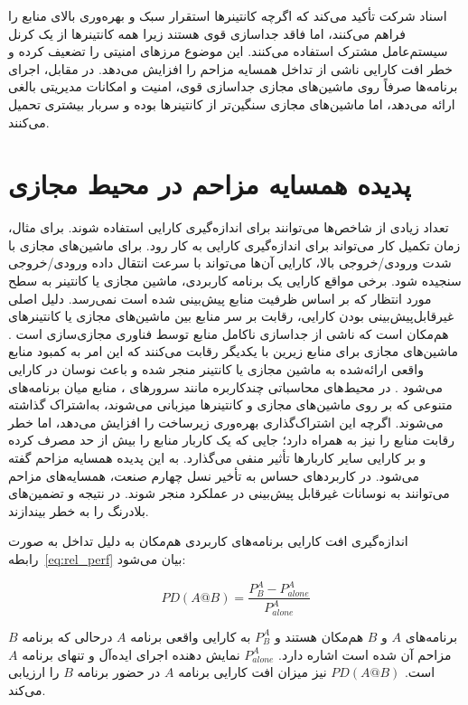 اسناد شرکت  تأکید می‌کند\cite{vmware_whitepaper} که اگرچه کانتینرها استقرار سبک و بهره‌وری بالای منابع را فراهم می‌کنند، اما فاقد جداسازی قوی هستند زیرا همه کانتینرها از یک کرنل سیستم‌عامل مشترک استفاده می‌کنند. این موضوع مرزهای امنیتی را تضعیف کرده و خطر افت کارایی ناشی از تداخل همسایه‌ مزاحم را افزایش می‌دهد. در مقابل، اجرای برنامه‌ها صرفاً روی ماشین‌های مجازی جداسازی قوی، امنیت و امکانات مدیریتی بالغی ارائه می‌دهد، اما ماشین‌های مجازی سنگین‌تر از کانتینرها بوده و سربار بیشتری تحمیل می‌کنند.

\section{پدیده همسایه مزاحم در محیط مجازی}

تعداد زیادی از شاخص‌ها می‌توانند برای اندازه‌گیری کارایی استفاده شوند. برای مثال، زمان تکمیل کار می‌تواند برای اندازه‌گیری کارایی به کار رود. برای ماشین‌های مجازی با شدت ورودی/خروجی بالا، کارایی آن‌ها می‌تواند با سرعت انتقال داده ورودی/خروجی سنجیده شود. برخی مواقع کارایی یک برنامه کاربردی، ماشین مجازی یا کانتینر به سطح مورد انتظار که بر اساس ظرفیت منابع پیش‌بینی شده است نمی‌رسد. دلیل اصلی غیرقابل‌پیش‌بینی بودن کارایی، رقابت بر سر منابع بین ماشین‌های مجازی یا کانتینرهای هم‌مکان است که ناشی از جداسازی ناکامل منابع توسط فناوری مجازی‌سازی است \cite{armbrust2009clouds}. ماشین‌های مجازی برای منابع زیرین با یکدیگر رقابت می‌کنند که این امر به کمبود منابع واقعی ارائه‌شده به ماشین مجازی یا کانتینر منجر شده و باعث نوسان در کارایی می‌شود \cite{koh2007interference}. در محیط‌های محاسباتی چندکاربره مانند سرورهای ، منابع میان برنامه‌های متنوعی که بر روی ماشین‌های مجازی و کانتینرها میزبانی می‌شوند، به‌اشتراک گذاشته می‌شوند. اگرچه این اشتراک‌گذاری بهره‌وری زیرساخت را افزایش می‌دهد، اما خطر رقابت منابع را نیز به همراه دارد؛ جایی که یک کاربار منابع را بیش از حد مصرف کرده و بر کارایی سایر کاربارها تأثیر منفی می‌گذارد. به این پدیده همسایه مزاحم گفته می‌شود. در کاربردهای حساس به تأخیر نسل چهارم صنعت، همسایه‌های مزاحم می‌توانند به نوسانات غیرقابل پیش‌بینی در عملکرد منجر شوند. در نتیجه  و تضمین‌های بلادرنگ را به خطر بیندازند.

اندازه‌گیری افت کارایی برنامه‌های کاربردی هم‌مکان به دلیل تداخل به صورت رابطه~\eqref{eq:rel_perf} بیان می‌شود\cite{lin2023vminterference}:

\begin{equation} \label{eq:rel_perf}
    PD(A@B) = \frac{P^A_B - P^A_{alone}}{P^A_{alone}}
\end{equation}

برنامه‌های $A$ و $B$ هم‌مکان هستند و $P^A_B$ به کارایی واقعی برنامه $A$ درحالی که برنامه $B$ مزاحم آن شده است اشاره دارد. $P^A_{alone}$ نمایش دهنده اجرای ایده‌آل و تنهای برنامه $A$ است. $PD(A@B)$ نیز میزان افت کارایی برنامه $A$ در حضور برنامه $B$ را ارزیابی می‌کند.

